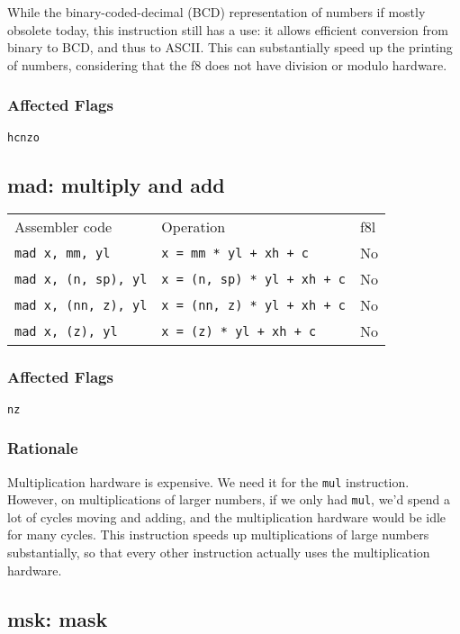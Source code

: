 \documentclass{book}
\begin{document}
While the binary-coded-decimal (BCD) representation of numbers if mostly obsolete today, this instruction still has a use: it allows efficient conversion from binary to BCD, and thus to ASCII. This can substantially speed up the printing of numbers, considering that the f8 does not have division or modulo hardware.

\subsubsection*{Affected Flags}

\texttt{hcnzo}


\subsection{mad: multiply and add}

\begin{tabular}{l l l}
Assembler code              & Operation                          & f8l \\
\texttt{mad x, mm, yl}      & \texttt{x = mm * yl + xh + c}      & No \\
\texttt{mad x, (n, sp), yl} & \texttt{x = (n, sp) * yl + xh + c} & No \\
\texttt{mad x, (nn, z), yl} & \texttt{x = (nn, z) * yl + xh + c} & No \\
\texttt{mad x, (z), yl}     & \texttt{x = (z) * yl + xh + c}     & No \\
\end{tabular}

\subsubsection*{Affected Flags}

\texttt{nz}

\subsubsection*{Rationale}

Multiplication hardware is expensive. We need it for the \texttt{mul} instruction. However, on multiplications of larger numbers, if we only had \texttt{mul}, we'd spend a lot of cycles moving and adding, and the multiplication hardware would be idle for many cycles. This instruction speeds up multiplications of large numbers substantially, so that every other instruction actually uses the multiplication hardware.

\subsection{msk: mask}
\end{document}
